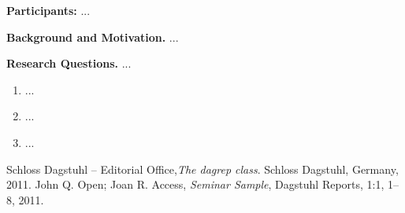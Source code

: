 
\license

\textbf{\sffamily Participants:} ...

\medskip\noindent
\textbf{\sffamily Background and Motivation.} ...

\medskip\noindent\textbf{\sffamily Research Questions.} 
...
\begin{enumerate}
\item ...
\item ...
\item ...
\end{enumerate}

\begin{thebibliography}{0}
 Schloss Dagstuhl -- Editorial Office,\textsl{The dagrep class}. Schloss Dagstuhl, Germany, 2011.
 John Q. Open; Joan R. Access, \textsl{Seminar Sample}, Dagstuhl Reports, 1:1, 1--8, 2011.
\end{thebibliography}


